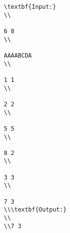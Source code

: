 \begin{verbatim}
\textbf{Input:}
\\

6 8
\\

AAAABCDA
\\

1 1
\\

2 2
\\

5 5
\\

8 2
\\

3 3
\\

7 3
\\\textbf{Output:}
\\
\\7 3\end{verbatim}